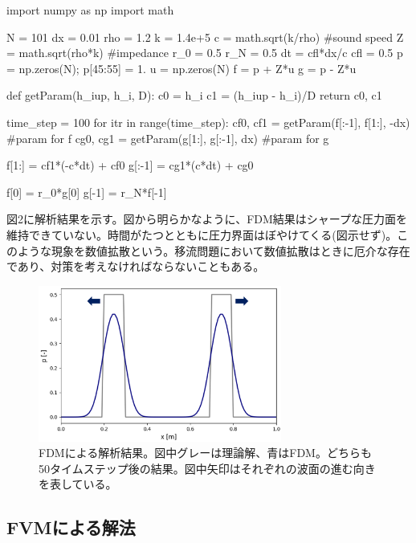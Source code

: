 \documentclass[dvipdfmx, 9pt, a4paper]{jsarticle}
\begin{document}
\begin{python}
import numpy as np
import math

N = 101
dx = 0.01
rho = 1.2
k = 1.4e+5
c = math.sqrt(k/rho) #sound speed
Z = math.sqrt(rho*k) #impedance
r_0 = 0.5
r_N = 0.5
dt = cfl*dx/c
cfl = 0.5
p = np.zeros(N); p[45:55] = 1.
u = np.zeros(N)
f = p + Z*u
g = p - Z*u

def getParam(h_iup, h_i, D):
	c0 = h_i
	c1 = (h_iup - h_i)/D
	return c0, c1

time_step = 100
for itr in range(time_step):
	cf0, cf1 = getParam(f[:-1], f[1:], -dx) #param for f
	cg0, cg1 = getParam(g[1:], g[:-1], dx) #param for g

	f[1:] = cf1*(-c*dt) + cf0
	g[:-1] = cg1*(c*dt) + cg0

	f[0] = r_0*g[0]
	g[-1] = r_N*f[-1]
\end{python}\par
図2に解析結果を示す。図から明らかなように、FDM結果はシャープな圧力面を維持できていない。時間がたつとともに圧力界面はぼやけてくる(図示せず)。このような現象を数値拡散という。移流問題において数値拡散はときに厄介な存在であり、対策を考えなければならないこともある。

\begin{figure}[t]
\begin{center}
\includegraphics[width=8cm]{"fig2.png"}
\caption{FDMによる解析結果。図中グレーは理論解、青はFDM。どちらも50タイムステップ後の結果。図中矢印はそれぞれの波面の進む向きを表している。}
\end{center}
\end{figure}

\subsection{FVMによる解法}
\end{document}
